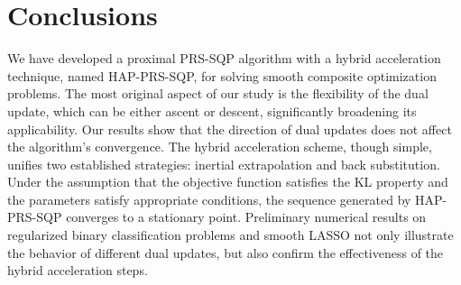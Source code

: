 \documentclass[pdflatex,sn-mathphys-num]{sn-jnl}%
\theoremstyle{thmstyleone}%
\theoremstyle{thmstyletwo}%
\theoremstyle{thmstylethree}%
\begin{document}
\section{Conclusions}\label{sec6}
We have developed a proximal PRS-SQP algorithm with a hybrid acceleration technique, named HAP-PRS-SQP, for solving smooth composite optimization problems. The most original aspect of our study is the flexibility of the dual update, which can be either ascent or descent, significantly broadening its applicability. Our results show that the direction of dual updates does not affect the algorithm's convergence. The hybrid acceleration scheme, though simple, unifies two established strategies: inertial extrapolation and back substitution. Under the assumption that the objective function satisfies the KL property and the parameters satisfy  appropriate conditions, the sequence generated by HAP-PRS-SQP converges to a stationary point. Preliminary numerical results on regularized binary classification problems and smooth LASSO not only illustrate the behavior of different dual updates, but also confirm the effectiveness of the hybrid acceleration steps.





\end{document}
